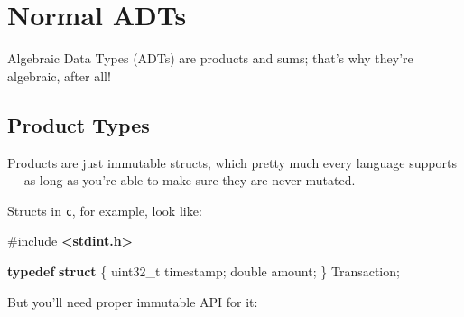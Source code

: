 \documentclass[]{article}
\newenvironment{Shaded}{}{}
\newcommand{\DataTypeTok}[1]{\textcolor[rgb]{0.56,0.13,0.00}{#1}}
\newcommand{\ImportTok}[1]{\textcolor[rgb]{0.00,0.50,0.00}{\textbf{#1}}}
\newcommand{\KeywordTok}[1]{\textcolor[rgb]{0.00,0.44,0.13}{\textbf{#1}}}
\newcommand{\NormalTok}[1]{#1}
\newcommand{\OperatorTok}[1]{\textcolor[rgb]{0.40,0.40,0.40}{#1}}
\newcommand{\PreprocessorTok}[1]{\textcolor[rgb]{0.74,0.48,0.00}{#1}}
\begin{document}
\section{Normal ADTs}\label{normal-adts}

Algebraic Data Types (ADTs) are products and sums; that's why they're algebraic,
after all!

\subsection{Product Types}\label{product-types}

Products are just immutable structs, which pretty much every language supports
--- as long as you're able to make sure they are never mutated.

Structs in \texttt{c}, for example, look like:

\begin{Shaded}
\begin{Highlighting}[]
\PreprocessorTok{\#include }\ImportTok{\textless{}stdint.h\textgreater{}}

\KeywordTok{typedef} \KeywordTok{struct} \OperatorTok{\{}
    \DataTypeTok{uint32\_t}\NormalTok{ timestamp}\OperatorTok{;}
    \DataTypeTok{double}\NormalTok{ amount}\OperatorTok{;}
\OperatorTok{\}}\NormalTok{ Transaction}\OperatorTok{;}
\end{Highlighting}
\end{Shaded}

But you'll need proper immutable API for it:
\end{document}
